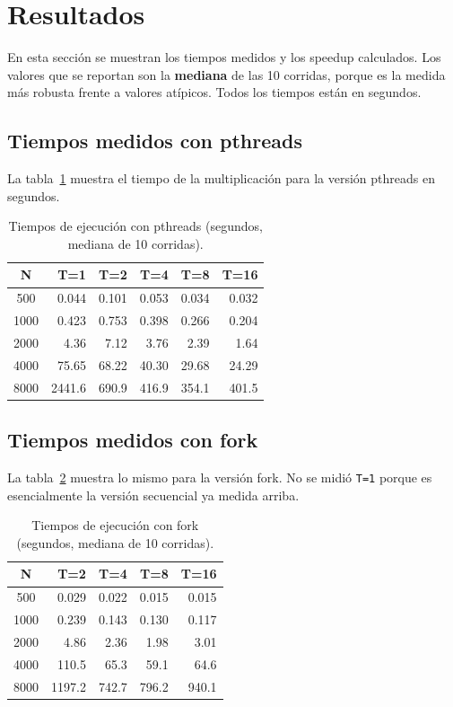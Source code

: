 \section{Resultados}

En esta sección se muestran los tiempos medidos y los speedup calculados. Los valores que se reportan son la \textbf{mediana} de las 10 corridas, porque es la medida más robusta frente a valores atípicos. Todos los tiempos están en segundos.

\subsection{Tiempos medidos con pthreads}

La tabla~\ref{tab:tiempos-pthreads} muestra el tiempo de la multiplicación para la versión pthreads en segundos.

\begin{table}[ht]
\centering
\begin{tabular}{|c|r|r|r|r|r|}
\hline
\textbf{N} & \textbf{T=1} & \textbf{T=2} & \textbf{T=4} & \textbf{T=8} & \textbf{T=16} \\
\hline
500  & 0.044  & 0.101  & 0.053  & 0.034  & 0.032 \\
1000 & 0.423  & 0.753  & 0.398  & 0.266  & 0.204 \\
2000 & 4.36   & 7.12   & 3.76   & 2.39   & 1.64 \\
4000 & 75.65  & 68.22  & 40.30  & 29.68  & 24.29 \\
8000 & 2441.6 & 690.9  & 416.9  & 354.1  & 401.5 \\
\hline
\end{tabular}
\caption{Tiempos de ejecución con pthreads (segundos, mediana de 10 corridas).}
\label{tab:tiempos-pthreads}
\end{table}

\subsection{Tiempos medidos con fork}

La tabla~\ref{tab:tiempos-fork} muestra lo mismo para la versión fork. No se midió \texttt{T=1} porque es esencialmente la versión secuencial ya medida arriba.

\begin{table}[ht]
\centering
\begin{tabular}{|c|r|r|r|r|}
\hline
\textbf{N} & \textbf{T=2} & \textbf{T=4} & \textbf{T=8} & \textbf{T=16} \\
\hline
500  & 0.029  & 0.022  & 0.015  & 0.015 \\
1000 & 0.239  & 0.143  & 0.130  & 0.117 \\
2000 & 4.86   & 2.36   & 1.98   & 3.01 \\
4000 & 110.5  & 65.3   & 59.1   & 64.6 \\
8000 & 1197.2 & 742.7  & 796.2  & 940.1 \\
\hline
\end{tabular}
\caption{Tiempos de ejecución con fork (segundos, mediana de 10 corridas).}
\label{tab:tiempos-fork}
\end{table}

